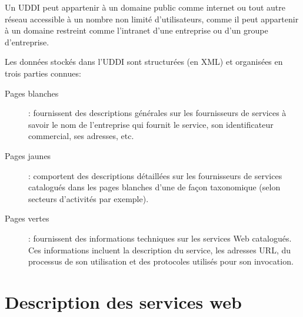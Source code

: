    Un \textsc{UDDI} peut appartenir à un domaine public comme internet
   ou tout autre réseau accessible à un nombre non limité
   d’utilisateurs, comme il peut appartenir à un domaine restreint
   comme l'intranet d’une entreprise ou d'un groupe d'entreprise.

   Les données stockés dans l'UDDI sont structurées (en \textsc{XML})
   et organisées en trois parties connues:

   \begin{description} %
     \item[Pages blanches]: fournissent des descriptions générales sur
       les fournisseurs de services à savoir le nom de l'entreprise qui
       fournit le service, son identificateur commercial, ses adresses,
       etc.
        
     \item[Pages jaunes]: comportent des descriptions détaillées sur
       les fournisseurs de services catalogués dans les pages blanches
       d'une de façon taxonomique (selon secteurs d'activités par
       exemple).

     \item[Pages vertes]: fournissent des informations techniques sur
       les services Web catalogués. Ces informations incluent la
       description du service, les adresses \textsc{URL}, du processus
       de son utilisation et des protocoles utilisés pour son
       invocation.
        
    \end{description}


  \section{Description des services web}
  \label{sec:ws-description}

